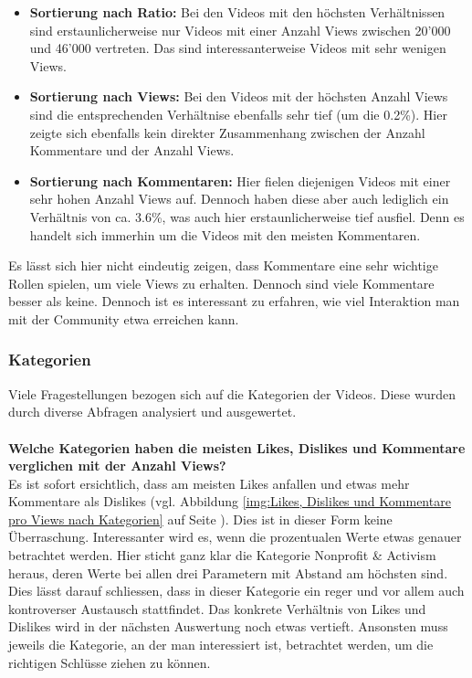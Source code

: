 \documentclass[12pt,titlepage]{article}
\begin{document}
\begin{itemize}
\item \textbf{Sortierung nach Ratio:} Bei den Videos mit den höchsten Verhältnissen sind erstaunlicherweise nur Videos mit einer Anzahl Views zwischen 20'000 und 46'000 vertreten. Das sind interessanterweise Videos mit sehr wenigen Views.
\item \textbf{Sortierung nach Views:} Bei den Videos mit der höchsten Anzahl Views sind die entsprechenden Verhältnise ebenfalls sehr tief (um die 0.2\%). Hier zeigte sich ebenfalls kein direkter Zusammenhang zwischen der Anzahl Kommentare und der Anzahl Views.
\item \textbf{Sortierung nach Kommentaren:} Hier fielen diejenigen Videos mit einer sehr hohen Anzahl Views auf. Dennoch haben diese aber auch lediglich ein Verhältnis von ca. 3.6\%, was auch hier erstaunlicherweise tief ausfiel. Denn es handelt sich immerhin um die Videos mit den meisten Kommentaren.
\end{itemize}

Es lässt sich hier nicht eindeutig zeigen, dass Kommentare eine sehr wichtige Rollen spielen, um viele Views zu erhalten. Dennoch sind viele Kommentare besser als keine. Dennoch ist es interessant zu erfahren, wie viel Interaktion man mit der Community etwa erreichen kann. 

\subsubsection{Kategorien}
Viele Fragestellungen bezogen sich auf die Kategorien der Videos. Diese wurden durch diverse Abfragen analysiert und ausgewertet.\\
\\
\textbf{Welche Kategorien haben die meisten Likes, Dislikes und Kommentare verglichen mit der Anzahl Views?}\\
Es ist sofort ersichtlich, dass am meisten Likes anfallen und etwas mehr Kommentare als Dislikes (vgl. Abbildung \ref{img:Likes, Dislikes und Kommentare pro Views nach Kategorien} auf Seite \pageref{img:Likes, Dislikes und Kommentare pro Views nach Kategorien}). Dies ist in dieser Form keine Überraschung. Interessanter wird es, wenn die prozentualen Werte etwas genauer betrachtet werden. Hier sticht ganz klar die Kategorie \glqq Nonprofit \& Activism\grqq\, heraus, deren Werte bei allen drei Parametern mit Abstand am höchsten sind. Dies lässt darauf schliessen, dass in dieser Kategorie ein reger und vor allem auch kontroverser Austausch stattfindet. Das konkrete Verhältnis von Likes und Dislikes wird in der nächsten Auswertung noch etwas vertieft. Ansonsten muss jeweils die Kategorie, an der man interessiert ist, betrachtet werden, um die richtigen Schlüsse ziehen zu können.
\end{document}
